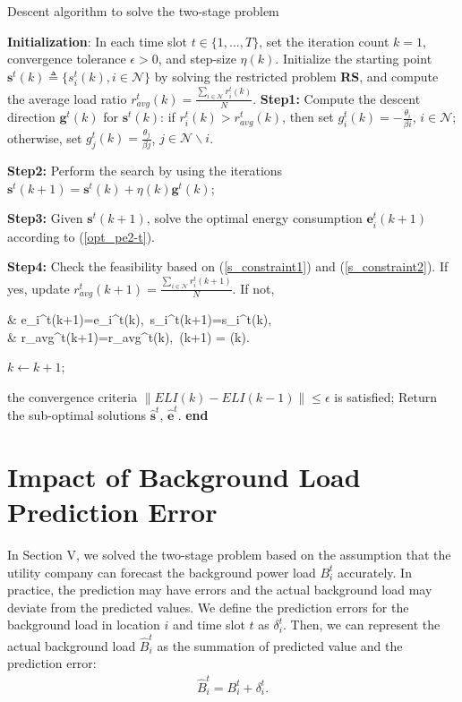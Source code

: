 \documentclass[journal]{IEEEtran}
\begin{document}
	\begin{algorithm}[h]
		\caption{Descent algorithm to solve the two-stage problem}
		\label{alg1}
		\begin{algorithmic}[1]
			\State \textbf{Initialization}: In each time slot $t \in \{1,...,T \}$, set the iteration count $k=1$, convergence tolerance $\epsilon>0$, and step-size $\eta(k)$. Initialize the starting point $\boldsymbol{s}^t(k) \triangleq \{ s_i^t(k),i\in \mathcal{N}\}$ by solving the restricted problem \textbf{RS}, and compute the average load ratio $r_{avg}^t(k) = \frac{\sum_{i \in \mathcal{N}} r_i^t(k)}{N} $. 
			\Repeat
			\State \textbf{Step1:} Compute the descent direction $\boldsymbol{g}^t (k)$ for $\boldsymbol{s}^t (k)$: if $r_i^t(k) > r_{avg}^t (k)$, then set $g_{i}^t (k)= - \frac{\theta_{i}}{\beta{i}}$, $i \in \mathcal{N}$; otherwise, set $g_{j}^t (k)= \frac{\theta_{j}}{\beta{j}}$, $j \in \mathcal{N} \backslash i$.
			
			\State \textbf{Step2:} Perform the search by using the iterations
			\State $\boldsymbol{s}^t (k+1)=\boldsymbol{s}^t (k) + \eta(k) \boldsymbol{g}^t(k)$;
			
			\State \textbf{Step3:} Given $\boldsymbol{s}^t(k+1)$, solve the optimal energy consumption $\boldsymbol{e}_{i}^{t}(k+1)$ according to (\ref{opt_pe2-t}).
			
			\State \textbf{Step4:} Check the feasibility based on (\ref{s_constraint1}) and (\ref{s_constraint2}). If yes, update $r_{avg}^t(k+1) = \frac{\sum_{i \in \mathcal{N}} r_i^t(k+1)}{N} $. 
			If not, 
			\begin{flalign*} 
				& e_{i}^{t}(k+1)=e_{i}^{t}(k),~s_{i}^{t}(k+1)=s_{i}^{t}(k),\\
				& r_{avg}^t(k+1)=r_{avg}^t(k),~\eta(k+1) =  \eta(k).
			\end{flalign*}
			
			\State $k \gets k+1$;
			
			\Until the convergence criteria $\| ELI(k) - ELI(k-1) \| \leq \epsilon$ is satisfied;
			\State Return the sub-optimal solutions $\boldsymbol{\hat{s}}^{t}$, $\boldsymbol{\hat{e}}^{t}$.
			\State \textbf{end}
		\end{algorithmic}
	\end{algorithm}
	
	
	\section{Impact of Background Load Prediction Error}
	In Section V, we solved the two-stage problem based on the assumption that the utility company can forecast the background power load $B_i^t$ accurately. In practice, the prediction may have errors and the actual background load may deviate from the predicted values. We define the prediction errors for the background load in location $i$ and time slot $t$ as $\delta_{i}^{t}$. Then, we can represent the actual background load $\hat{B}_{i}^{t}$ as the summation of predicted value and the prediction error:
	\begin{align*}
	\hat{B}_{i}^{t} = B_{i}^{t} + \delta_{i}^{t}. 
	\end{align*}
	
\end{document}
